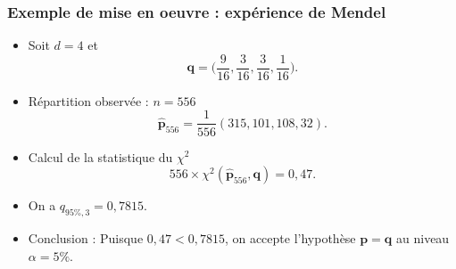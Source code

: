 \begin{frame}
\frametitle{Exemple de mise en oeuvre : expérience de Mendel}
\begin{itemize}
\item Soit $d=4$ et
$$\boldsymbol{q}=\Big(\frac{9}{16},\frac{3}{16},\frac{3}{16},\frac{1}{16}\Big).$$
\item \alert{Répartition observée} : $n=556$
$$\widehat {\boldsymbol p}_{556} = \frac{1}{556}(315,101,108,32).$$
\item \alert{Calcul de la statistique du $\chi^2$}
$$556 \times \chi^2(\widehat {\boldsymbol p}_{556}, \boldsymbol{q})=0,47.$$
\item On a $q_{95\%, 3}=0,7815$.
\item \alert{Conclusion :} Puisque $0,47 < 0,7815$, on accepte l'hypothèse $\boldsymbol{p}=\boldsymbol{q}$ au niveau $\alpha = 5\%$.
\end{itemize}
\end{frame}













